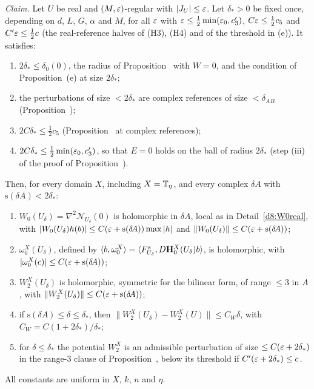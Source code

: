 \begin{detail}
\emph{Claim.} Let $U$ be real and $(M,\varepsilon)$-regular with $|J_U|\le\varepsilon$. Let $\delta_*>0$ be fixed once, depending on $d$, $L$, $G$, $\alpha$ and $M$, for all $\varepsilon$ with $\varepsilon\le\frac12\min(\varepsilon_0,c'_3)$, $C\varepsilon\le\frac12c_5$ and $C'\varepsilon\le\frac12c$ (the real-reference halves of (H3), (H4) and of the threshold in (e)). It satisfies:
\begin{enumerate}[label=(H\arabic*)]
\item $2\delta_*\le\delta_0(0)$, the radius of Proposition~ with $W=0$, and the condition of Proposition~(e) at size $2\delta_*$;
\item the perturbations of size $<2\delta_*$ are complex references of size $<\delta_{AB}$ (Proposition~);
\item $2C\delta_*\le\frac12c_5$ (Proposition~ at complex references);
\item $2C\delta_*\le\frac12\min(\varepsilon_0,c'_3)$, so that $E=0$ holds on the ball of radius $2\delta_*$ (step (iii) of the proof of Proposition~).
\end{enumerate}
Then, for every domain $X$, including $X=\mathbb T_\eta$, and every complex $\delta\!A$ with $\mathrm s(\delta\!A)<2\delta_*$:
\begin{enumerate}[label=(\alph*)]
\item $W_0(U_\delta)=\nabla^2\mathcal N_{U_\delta}(0)$ is holomorphic in $\delta\!A$, local as in Detail~\ref{d8:W0real}, with $|W_0(U_\delta)h(b)|\le C(\varepsilon+\mathrm s(\delta\!A))\max|h|$ and $\|W_0(U_\delta)\|\le C(\varepsilon+\mathrm s(\delta\!A))$;
\item $\omega_0^X(U_\delta)$, defined by $\langle b,\omega_0^X\rangle=\langle F^s_{U_\delta},D\mathbf H^X_0(U_\delta)b\rangle$, is holomorphic, with $|\omega_0^X(c)|\le C(\varepsilon+\mathrm s(\delta\!A))$;
\item $W_2^X(U_\delta)$ is holomorphic, symmetric for the bilinear form, of range $\le3$ in $A$, with $\|W_2^X(U_\delta)\|\le C(\varepsilon+\mathrm s(\delta\!A))$;
\item if $\mathrm s(\delta\!A)\le\delta\le\delta_*$, then $\|W_2^X(U_\delta)-W_2^X(U)\|\le C_W\delta$, with $C_W=C(1+2\delta_*)/\delta_*$;
\item for $\delta\le\delta_*$ the potential $W_2^X$ is an admissible perturbation of size $\le C(\varepsilon+2\delta_*)$ in the range-$3$ clause of Proposition~, below its threshold if $C'(\varepsilon+2\delta_*)\le c$.
\end{enumerate}
All constants are uniform in $X$, $k$, $n$ and $\eta$.


\end{detail}
